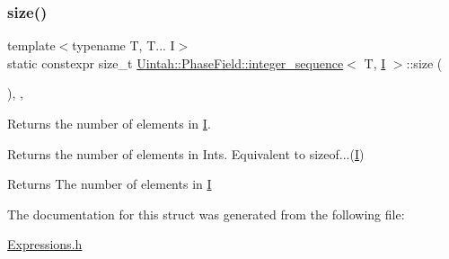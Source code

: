\subsubsection{\texorpdfstring{size()}{size()}}
{\footnotesize\ttfamily template$<$typename T, T... I$>$ \\
static constexpr size\+\_\+t \hyperlink{structUintah_1_1PhaseField_1_1integer__sequence}{Uintah\+::\+Phase\+Field\+::integer\+\_\+sequence}$<$ T, \hyperlink{structUintah_1_1PhaseField_1_1I}{I} $>$\+::size (\begin{DoxyParamCaption}{ }\end{DoxyParamCaption})\hspace{0.3cm}{\ttfamily [inline]}, {\ttfamily [static]}, {\ttfamily [noexcept]}}



Returns the number of elements in \hyperlink{structUintah_1_1PhaseField_1_1I}{I}. 

Returns the number of elements in Ints. Equivalent to sizeof...(\hyperlink{structUintah_1_1PhaseField_1_1I}{I})

\begin{DoxyReturn}{Returns}
The number of elements in \hyperlink{structUintah_1_1PhaseField_1_1I}{I} 
\end{DoxyReturn}


The documentation for this struct was generated from the following file\+:\begin{DoxyCompactItemize}
\item 
\hyperlink{Expressions_8h}{Expressions.\+h}\end{DoxyCompactItemize}
